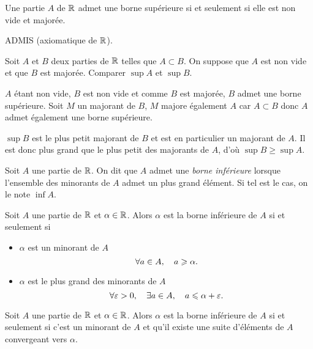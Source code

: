 \documentclass{magnolia}
\begin{document}
\begin{theoreme}
Une partie $A$ de $\mathbb{R}$ admet une borne supérieure si et seulement si elle est
non vide et majorée.
\end{theoreme}

\begin{preuve}
ADMIS (axiomatique de $\mathbb{R}$).
\end{preuve}

\begin{exoUnique}
\exo Soit $A$ et $B$ deux parties de $\mathbb{R}$ telles que $A\subset B$. On
  suppose que $A$ est non vide et que $B$ est majorée. Comparer $\sup A$ et
  $\sup B$.
\end{exoUnique}

\begin{sol}
$A$ étant non vide, $B$ est non vide et comme $B$ est majorée, $B$ admet une borne supérieure. Soit $M$ un majorant de $B$, $M$ majore également $A$ car $A\subset B$ donc $A$ admet également une borne supérieure.

$\sup B$ est le plus petit majorant de $B$ et est en particulier un majorant de $A$. Il est donc plus grand que le plus petit des majorants de $A$, d'où $\sup B \geq \sup A$.
\end{sol}


\begin{definition}[utile=-3]
Soit $A$ une partie de $\mathbb{R}$. On dit que $A$ admet une \emph{borne inférieure} lorsque
l'ensemble des minorants de $A$ admet un plus grand élément. Si tel est le cas,
on le note $\inf A$.
\end{definition}



\begin{proposition}
Soit $A$ une partie de $\mathbb{R}$ et $\alpha\in\mathbb{R}$. Alors $\alpha$ est la borne inférieure
de $A$ si et seulement si
\begin{itemize}
\item $\alpha$ est un minorant de $A$
  \[\forall a\in A ,\quad a \geqslant \alpha.\]
\item $\alpha$ est le plus grand des minorants de $A$
  \[\forall \varepsilon>0 ,\quad \exists a\in A ,\quad a\leqslant \alpha+\varepsilon.\]
\end{itemize}
\end{proposition}


\begin{proposition}
Soit $A$ une partie de $\mathbb{R}$ et $\alpha\in\mathbb{R}$. Alors $\alpha$ est la borne inférieure
de $A$ si et seulement si c'est un minorant de $A$ et qu'il existe une suite
d'éléments de $A$ convergeant vers $\alpha$.
\end{proposition}  
\end{document}
